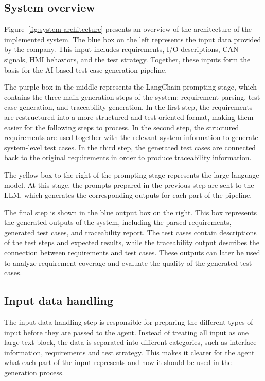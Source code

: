 \documentclass[a4paper,12pt]{article}
\begin{document}
\subsection{System overview}
Figure~\ref{fig:system-architecture} presents an overview of the architecture of the implemented system. The blue box on the left represents the input data provided by the company. This input includes requirements, I/O descriptions, CAN signals, HMI behaviors, and the test strategy. Together, these inputs form the basis for the AI-based test case generation pipeline.

The purple box in the middle represents the LangChain prompting stage, which contains the three main generation steps of the system: requirement parsing, test case generation, and traceability generation. In the first step, the requirements are restructured into a more structured and test-oriented format, making them easier for the following steps to process. In the second step, the structured requirements are used together with the relevant system information to generate system-level test cases. In the third step, the generated test cases are connected back to the original requirements in order to produce traceability information.

The yellow box to the right of the prompting stage represents the large language model. At this stage, the prompts prepared in the previous step are sent to the LLM, which generates the corresponding outputs for each part of the pipeline.

The final step is shown in the blue output box on the right. This box represents the generated outputs of the system, including the parsed requirements, generated test cases, and traceability report. The test cases contain descriptions of the test steps and expected results, while the traceability output describes the connection between requirements and test cases. These outputs can later be used to analyze requirement coverage and evaluate the quality of the generated test cases.


\subsection{Input data handling}
The input data handling step is responsible for preparing the different types of input before they are passed to the agent. Instead of treating all input as one large text block, the data is separated into different categories, such as interface information, requirements and test strategy. This makes it clearer for the agent what each part of the input represents and how it should be used in the generation process.
\end{document}
